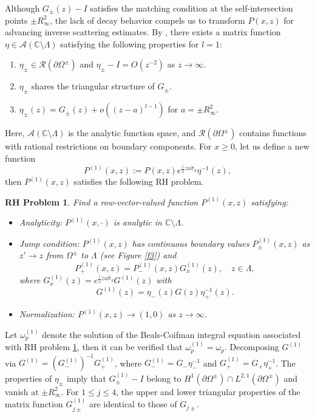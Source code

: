 \documentclass[preprint,compress,12pt]{elsarticle}
\newtheorem{rhp}{RH Problem}
\numberwithin{equation}{section}
\begin{document}
Although $G_{\pm}(z)-I$ satisfies the matching condition at the self-intersection points $\pm R_{\infty}^{2}$, the lack of decay behavior compels us to transform $P(x,z)$ for advancing inverse scattering estimates. By \cite{Zhou1998,LiY}, there exists a matrix function $\eta\in \mathcal{A}(\mathbb{C}\setminus\Lambda)$ satisfying the following properties for $l=1$:
\begin{enumerate}[label=(\roman*)]
  \item $\eta_{\pm}\in \mathcal{R}(\partial\Omega^{\pm})$ and $\eta_{\pm}-I=O(z^{-2})$ as $z\rightarrow \infty$.
  \item $\eta_{\pm}$ shares the triangular structure of $G_{\pm}$.
  \item $\eta_{\pm}(z)=G_{\pm}(z)+o\left((z-a)^{l-1}\right)$ for $a=\pm R_{\infty}^{2}$.
\end{enumerate}
Here, $\mathcal{A}(\mathbb{C}\setminus\Lambda)$ is the analytic function space, and $\mathcal{R}(\partial\Omega^{\pm})$ contains functions with rational restrictions on boundary components.  For $x\geq0$,  let us define a new function
\begin{equation}
P^{(1)}(x,z):=P(x,z)e^{\frac{i}{2}zx\widehat{\sigma}_{3}}\eta^{-1}(z),
\end{equation}
then $P^{(1)}(x,z)$ satisfies the following RH problem.
\begin{rhp}\label{RHp1}
Find a row-vector-valued function $P^{(1)}(x,z)$ satisfying:
\begin{itemize}
  \item Analyticity: $P^{(1)}(x,\cdot)$ is analytic in $\mathbb{C}\setminus\Lambda$.
  \item Jump condition: $P^{(1)}(x,z)$ has continuous boundary values $P^{(1)}_{\pm}(x,z)$ as $z'\rightarrow z$ from $\Omega^{\pm}$ to $\Lambda$ (see Figure \ref{f3}) and
      \begin{equation}
      P^{(1)}_{+}(x,z)=P^{(1)}_{-}(x,z)G^{(1)}_{x}(z),\quad z\in\Lambda,
      \end{equation}
      where $G^{(1)}_{x}(z)=e^{\frac{i}{2}zx\widehat{\sigma}_{3}}G^{(1)}(z)$ with
      \begin{equation}
      G^{(1)}(z)=\eta_{-}(z)G(z)\eta_{+}^{-1}(z).
      \end{equation}
  \item Normalization: $P^{(1)}(x,z)\rightarrow (1,0)$ as $z\rightarrow\infty$.
\end{itemize}
\end{rhp}
Let $\omega_{p}^{(1)}$ denote the solution of the Beals-Coifman integral equation associated with RH problem \ref{RHp1}, then it can be verified that $\omega_{p}^{(1)}=\omega_{p}$. Decomposing $G^{(1)}$ via $G^{(1)}=(G^{(1)}_{-})^{-1}G^{(1)}_{+}$, where $G^{(1)}_{-}=G_{-}\eta_{-}^{-1}$ and $G^{(1)}_{+}=G_{+}\eta_{+}^{-1}$. The properties of $\eta_{\pm}$ imply that $G^{(1)}_{\pm}-I$ belong to $H^{1}(\partial\Omega^{\pm})\cap L^{2,1}(\partial\Omega^{\pm})$ and vanish at $\pm R_{\infty}^{2}$. For $1\leq j\leq4$, the upper and lower triangular properties of the matrix function $G^{(1)}_{j\pm}$ are identical to those of $G_{j\pm}$.
\end{document}
